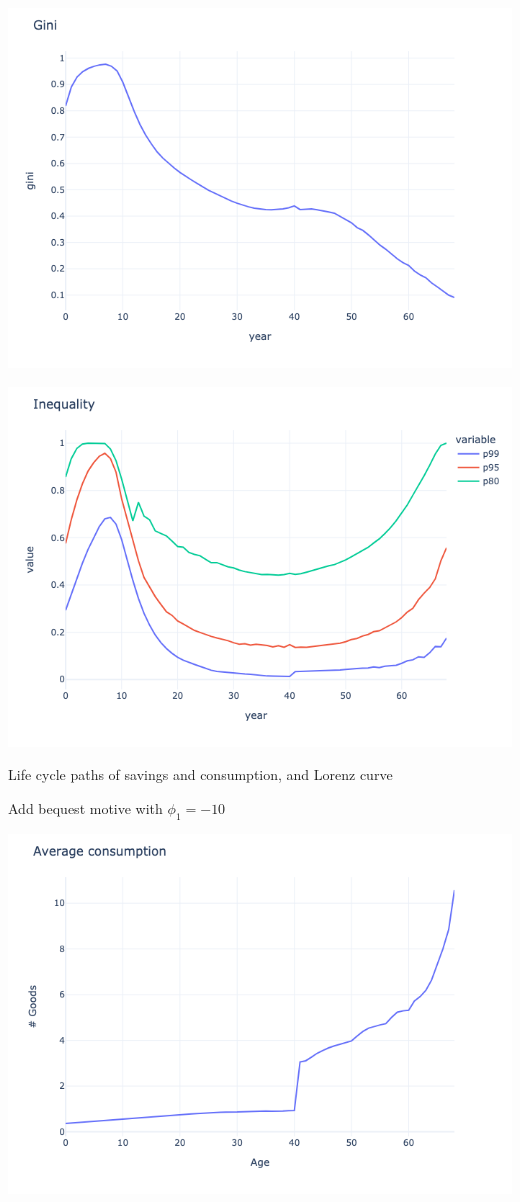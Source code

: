 \begin{questions}
\begin{solution}
\includegraphics[scale=0.5]{figures/gini_0.png}

\includegraphics[scale=0.5]{figures/inequality_0.png}

Life cycle paths of savings and consumption, and Lorenz curve


Add bequest motive with $\phi_1 = -10$


\includegraphics[scale=0.5]{figures/consumption_-10.png}


\end{solution}
\end{questions}
